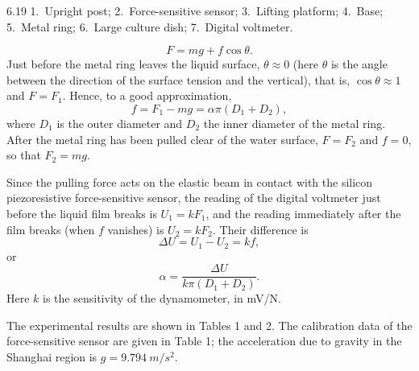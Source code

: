 \begin{figbox}{6.19}
\smallskip
{\footnotesize 1.\ Upright post; 2.\ Force-sensitive sensor; 3.\ Lifting platform; 4.\ Base; 5.\ Metal ring; 6.\ Large culture dish; 7.\ Digital voltmeter.}
\end{figbox}

\begin{equation}\tag{1}
F=mg+f\cos\theta .
\end{equation}
Just before the metal ring leaves the liquid surface, $\theta\approx0$ (here $\theta$ is the angle between the direction of the surface tension and the vertical), that is, $\cos\theta\approx1$ and $F=F_1$. Hence, to a good approximation,
\begin{equation*}
f=F_1-mg=\alpha\pi(D_1+D_2),
\end{equation*}
where $D_1$ is the outer diameter and $D_2$ the inner diameter of the metal ring. After the metal ring has been pulled clear of the water surface, $F=F_2$ and $f=0$, so that $F_2=mg$.

Since the pulling force acts on the elastic beam in contact with the silicon piezoresistive force-sensitive sensor, the reading of the digital voltmeter just before the liquid film breaks is $U_1=kF_1$, and the reading immediately after the film breaks (when $f$ vanishes) is $U_2=kF_2$. Their difference is
\begin{equation*}
\Delta U=U_1-U_2=kf,
\end{equation*}
or
\begin{equation}\tag{2}
\alpha=\frac{\Delta U}{k\pi(D_1+D_2)}.
\end{equation}
Here $k$ is the sensitivity of the dynamometer, in \si{mV/N}.

The experimental results are shown in Tables 1 and 2. The calibration data of the force-sensitive sensor are given in Table 1; the acceleration due to gravity in the Shanghai region is $g=\SI{9.794}{m/s^2}$.

